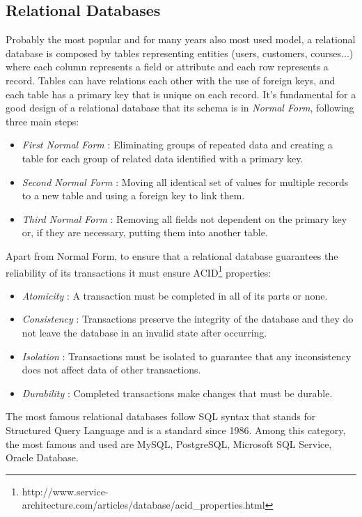 \subsection{Relational Databases}
\label{sec:description}

Probably the most popular and for many years also most used model, a relational database is composed by tables representing entities (users, customers, courses...) where each column represents a field or attribute and each row represents a record.
Tables can have relations each other with the use of foreign keys, and each table has a primary key that is unique on each record.
It’s fundamental for a good design of a relational database that its schema is in \textit{Normal Form}, following three main steps:
\begin{itemize}
	\item \textit{First Normal Form} : Eliminating groups of repeated data and creating a table for each group of related data identified with a primary key.
	\item \textit{Second Normal Form} : Moving all identical set of values for multiple records to a new table and using a foreign key to link them.
	\item \textit{Third Normal Form} : Removing all fields not dependent on the primary key or, if they are necessary, putting them into another table.
\end{itemize}
Apart from Normal Form, to ensure that a relational database guarantees the reliability of its transactions it must ensure ACID\footnote{http://www.service-architecture.com/articles/database/acid\_properties.html} properties:
\begin{itemize}
	\item \textit{Atomicity} : A transaction must be completed in all of its parts or none.
	\item \textit{Consistency} : Transactions preserve the integrity of the database and they do not leave the database in an invalid state after occurring.
	\item \textit{Isolation} : Transactions must be isolated to guarantee that any inconsistency does not affect data of other transactions.
	\item \textit{Durability} : Completed transactions make changes that must be durable.
\end{itemize}
The most famous relational databases follow SQL syntax that stands for Structured Query Language and is a standard since 1986.
Among this category, the most famous and used are MySQL, PostgreSQL, Microsoft SQL Service, Oracle Database.
